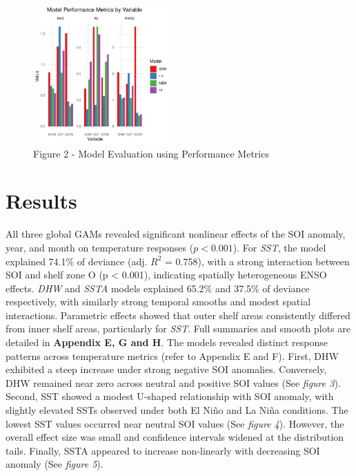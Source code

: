 \documentclass[letterpaper,9pt,twocolumn,twoside,]{pinp}
\begin{document}
\begin{figure}[H]

{\centering \includegraphics[width=1\linewidth,height=200px]{Reef03_FinalReport_files/figure-latex/unnamed-chunk-2-1} 

}

\caption{Figure 2 - Model Evaluation using Performance Metrics}\label{fig:unnamed-chunk-2}
\end{figure}

\section{Results}\label{results}

All three global GAMs revealed significant nonlinear effects of the SOI
anomaly, year, and month on temperature responses (\(p < 0.001\)). For
\emph{SST}, the model explained 74.1\% of deviance (adj. \(R^2\) =
0.758), with a strong interaction between SOI and shelf zone O (p
\textless{} 0.001), indicating spatially heterogeneous ENSO effects.
\emph{DHW} and \emph{SSTA} models explained 65.2\% and 37.5\% of
deviance respectively, with similarly strong temporal smooths and modest
spatial interactions. Parametric effects showed that outer shelf areas
consistently differed from inner shelf areas, particularly for
\emph{SST}. Full summaries and smooth plots are detailed in
\textbf{Appendix E, G and H}. The models revealed distinct response
patterns across temperature metrics (refer to Appendix E and F). First,
DHW exhibited a steep increase under strong negative SOI anomalies.
Conversely, DHW remained near zero across neutral and positive SOI
values (See \emph{figure 3}). Second, SST showed a modest U-shaped
relationship with SOI anomaly, with slightly elevated SSTs observed
under both El Niño and La Niña conditions. The lowest SST values
occurred near neutral SOI values (See \emph{figure 4}). However, the
overall effect size was small and confidence intervals widened at the
distribution tails. Finally, SSTA appeared to increase non-linearly with
decreasing SOI anomaly (See \emph{figure 5}).
\end{document}
